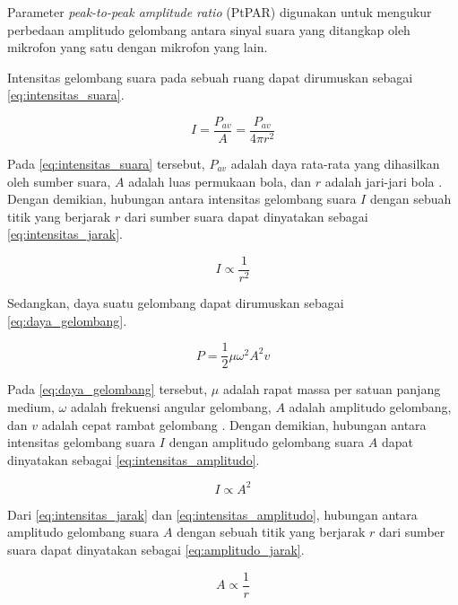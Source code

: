 Parameter \textit{peak-to-peak amplitude ratio} (PtPAR) digunakan untuk mengukur perbedaan amplitudo gelombang antara sinyal suara yang ditangkap oleh mikrofon yang satu dengan mikrofon yang lain.

Intensitas gelombang suara pada sebuah ruang dapat dirumuskan sebagai \autoref{eq:intensitas_suara}.

\begin{equation}\label{eq:intensitas_suara}
I = \frac{P_{av}}{A} = \frac{P_{av}}{4 \pi r^2}
\end{equation}

Pada \autoref{eq:intensitas_suara} tersebut, $P_{av}$ adalah daya rata-rata yang dihasilkan oleh sumber suara, $A$ adalah luas permukaan bola, dan $r$ adalah jari-jari bola \cite{halliday2004}. Dengan demikian, hubungan antara intensitas gelombang suara $I$  dengan sebuah titik yang berjarak $r$ dari sumber suara dapat dinyatakan sebagai \autoref{eq:intensitas_jarak}.

\begin{equation} \label{eq:intensitas_jarak}
I \propto \frac{1}{r^2}
\end{equation}

Sedangkan, daya suatu gelombang dapat dirumuskan sebagai \autoref{eq:daya_gelombang}.

\begin{equation}\label{eq:daya_gelombang}
P = \frac{1}{2}	\mu \omega^2 A^2 v
\end{equation}

Pada \autoref{eq:daya_gelombang} tersebut, $\mu$ adalah rapat massa per satuan panjang medium, $\omega$ adalah frekuensi angular gelombang, $A$ adalah amplitudo gelombang, dan $v$ adalah cepat rambat gelombang \cite{halliday2004}. Dengan demikian, hubungan antara intensitas gelombang suara $I$ dengan amplitudo gelombang suara $A$ dapat dinyatakan sebagai \autoref{eq:intensitas_amplitudo}.

\begin{equation} \label{eq:intensitas_amplitudo}
I \propto {A^2}
\end{equation}

Dari \autoref{eq:intensitas_jarak} dan \autoref{eq:intensitas_amplitudo}, hubungan antara amplitudo gelombang suara $A$ dengan sebuah titik yang berjarak $r$ dari sumber suara dapat dinyatakan sebagai \autoref{eq:amplitudo_jarak}.

\begin{equation} \label{eq:amplitudo_jarak}
A \propto \frac{1}{r}
\end{equation}

